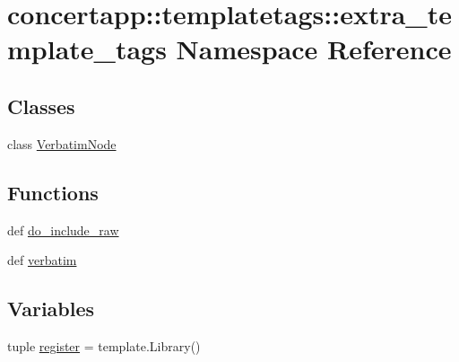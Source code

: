 \hypertarget{namespaceconcertapp_1_1templatetags_1_1extra__template__tags}{
\section{concertapp::templatetags::extra\_\-template\_\-tags Namespace Reference}
\label{namespaceconcertapp_1_1templatetags_1_1extra__template__tags}
}
\subsection*{Classes}
\begin{DoxyCompactItemize}
\item 
class \hyperlink{classconcertapp_1_1templatetags_1_1extra__template__tags_1_1_verbatim_node}{VerbatimNode}
\end{DoxyCompactItemize}
\subsection*{Functions}
\begin{DoxyCompactItemize}
\item 
def \hyperlink{namespaceconcertapp_1_1templatetags_1_1extra__template__tags_a2927aeb3d3624a893a9082e9ce8f8ff9}{do\_\-include\_\-raw}
\item 
def \hyperlink{namespaceconcertapp_1_1templatetags_1_1extra__template__tags_a6e077cb163ead00e526432e906d05ad8}{verbatim}
\end{DoxyCompactItemize}
\subsection*{Variables}
\begin{DoxyCompactItemize}
\item 
tuple \hyperlink{namespaceconcertapp_1_1templatetags_1_1extra__template__tags_ac6d2d1e02fc76b94dea43fdcc69d4574}{register} = template.Library()
\end{DoxyCompactItemize}



